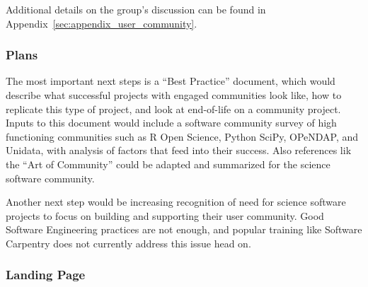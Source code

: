 Additional details on the group's discussion can be found in Appendix~\ref{sec:appendix_user_community}.

\subsubsection{Plans}

The most important next steps is a ``Best Practice'' document, which would describe what successful projects with engaged
communities look like, how to replicate this type of project, and look at end-of-life on a community project. Inputs to this
document would include a software community survey of high functioning communities such as R Open Science, Python SciPy,
OPeNDAP, and Unidata, with analysis of factors that feed into their success. Also references lik the ``Art of Community'' could
be adapted and summarized for the science software community.

Another next step would be increasing recognition of need for science software projects to focus on building and supporting
their user community. Good Software Engineering practices are not enough, and popular training like Software Carpentry does
not currently address this issue head on.

\subsubsection{Landing Page}
